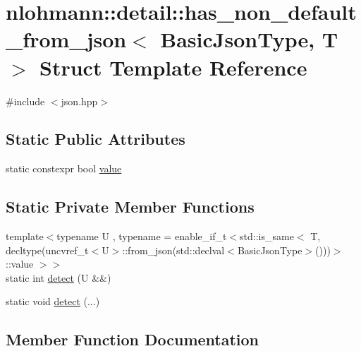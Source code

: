 \hypertarget{structnlohmann_1_1detail_1_1has__non__default__from__json}{}\section{nlohmann\+:\+:detail\+:\+:has\+\_\+non\+\_\+default\+\_\+from\+\_\+json$<$ Basic\+Json\+Type, T $>$ Struct Template Reference}
\label{structnlohmann_1_1detail_1_1has__non__default__from__json}


{\ttfamily \#include $<$json.\+hpp$>$}

\subsection*{Static Public Attributes}
\begin{DoxyCompactItemize}
\item 
static constexpr bool \hyperlink{structnlohmann_1_1detail_1_1has__non__default__from__json_ad34bb7cd3961fcafc2c5047a9782e931}{value}
\end{DoxyCompactItemize}
\subsection*{Static Private Member Functions}
\begin{DoxyCompactItemize}
\item 
{\footnotesize template$<$typename U , typename  = enable\+\_\+if\+\_\+t$<$std\+::is\+\_\+same$<$                                   T, decltype(uncvref\+\_\+t$<$\+U$>$\+::from\+\_\+json(std\+::declval$<$\+Basic\+Json\+Type$>$()))$>$\+::value $>$$>$ }\\static int \hyperlink{structnlohmann_1_1detail_1_1has__non__default__from__json_a87428058d4e01d8f034ec5b2574795a3}{detect} (U \&\&)
\item 
static void \hyperlink{structnlohmann_1_1detail_1_1has__non__default__from__json_aa9d6fc482c9b96cf5ffbba95d4afd01a}{detect} (...)
\end{DoxyCompactItemize}


\subsection{Member Function Documentation}
\mbox{\label{structnlohmann_1_1detail_1_1has__non__default__from__json_a87428058d4e01d8f034ec5b2574795a3}} 
